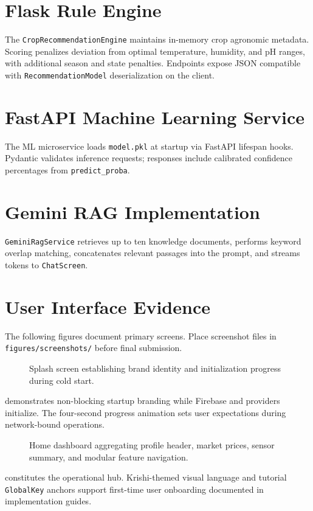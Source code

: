 \section{Flask Rule Engine}
The \texttt{CropRecommendationEngine} maintains in-memory crop agronomic metadata. Scoring penalizes deviation from optimal temperature, humidity, and pH ranges, with additional season and state penalties. Endpoints expose JSON compatible with \texttt{RecommendationModel} deserialization on the client.

\section{FastAPI Machine Learning Service}
The ML microservice loads \texttt{model.pkl} at startup via FastAPI lifespan hooks. Pydantic validates inference requests; responses include calibrated confidence percentages from \texttt{predict\_proba}.

\section{Gemini RAG Implementation}
\texttt{GeminiRagService} retrieves up to ten knowledge documents, performs keyword overlap matching, concatenates relevant passages into the prompt, and streams tokens to \texttt{ChatScreen}.

\section{User Interface Evidence}
The following figures document primary screens. Place screenshot files in \texttt{figures/screenshots/} before final submission.

\begin{figure}[htbp]
\centering
{}
\caption{Splash screen establishing brand identity and initialization progress during cold start.}
\label{fig:ui_splash}
\end{figure}
\noindent{} demonstrates non-blocking startup branding while Firebase and providers initialize. The four-second progress animation sets user expectations during network-bound operations.

\begin{figure}[htbp]
\centering
{}
\caption{Home dashboard aggregating profile header, market prices, sensor summary, and modular feature navigation.}
\label{fig:ui_home}
\end{figure}
\noindent{} constitutes the operational hub. Krishi-themed visual language and tutorial \texttt{GlobalKey} anchors support first-time user onboarding documented in implementation guides.


